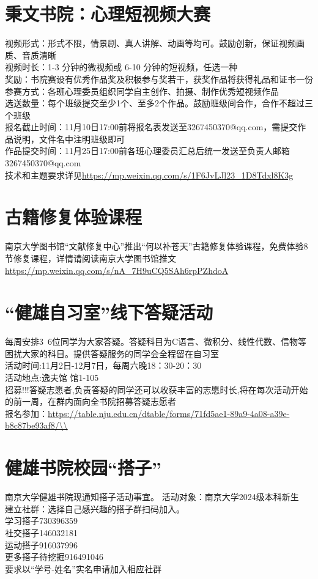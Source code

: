 \documentclass[letterpaper, 12pt]{article}
\begin{document}
\begin{multicols}{2}
\section{秉文书院：心理短视频大赛}
视频形式：形式不限，情景剧、真人讲解、动画等均可。鼓励创新，保证视频画质、音质清晰\\
视频时长：1-3 分钟的微视频或 6-10 分钟的短视频，任选一种\\
奖励：书院赛设有优秀作品奖及积极参与奖若干，获奖作品将获得礼品和证书一份\\
参赛方式：各班心理委员组织同学自主创作、拍摄、制作优秀短视频作品\\
选送数量：每个班级提交至少1个、至多2个作品。鼓励班级间合作，合作不超过三个班级\\
报名截止时间：11月10日17:00前将报名表发送至3267450370@qq.com，需提交作品说明，文件名中注明班级即可\\
作品提交时间：11月25日17:00前各班心理委员汇总后统一发送至负责人邮箱3267450370@qq.com\\
技术和主题要求详见\url{https://mp.weixin.qq.com/s/1F6JvLJl23_1D8Tdxl8K3g}

\section{古籍修复体验课程}
南京大学图书馆“文献修复中心”推出“何以补苍天”古籍修复体验课程，免费体验8节修复课程，详情请阅读南京大学图书馆推文\url{https://mp.weixin.qq.com/s/nA_7H9uCQ5SAh6rpPZhdoA}

\section{“健雄自习室”线下答疑活动}
每周安排3~6位同学为大家答疑。答疑科目为C语言、微积分、线性代数、信物等困扰大家的科目。提供答疑服务的同学会全程留在自习室\\
活动时间:11月2日-12月7日，每周六晚18：30-20：30\\
活动地点:逸夫馆 馆1-105\\
招募!!!答疑志愿者,负责答疑的同学还可以收获丰富的志愿时长,将在每次活动开始的前一周，在群内面向全书院招募答疑志愿者\\
报名参加：\url{https://table.nju.edu.cn/dtable/forms/71fd5ae1-89a9-4a08-a39e-b8c87be93af8/\\}

\section{健雄书院校园“搭子”}
南京大学健雄书院现通知搭子活动事宜。
活动对象：南京大学2024级本科新生\\
建立社群：选择自己感兴趣的搭子群扫码加入。\\
学习搭子730396359\\
社交搭子146032181\\
运动搭子916037996\\
更多搭子待挖掘916491046\\
要求以“学号-姓名”实名申请加入相应社群\\


\end{multicols}
\end{document}
